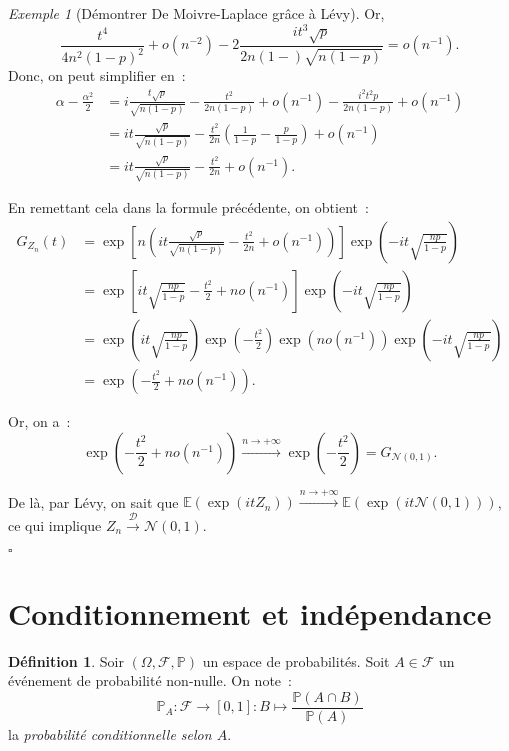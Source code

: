 \documentclass{article}
\newcommand{\E}{\mathbb E}
\renewcommand{\P}{\mathbb P}
\newcommand{\Nzu}{\mathcal N(0, 1)}  %
\newcommand{\convl}{\stackrel{\mathcal D}\to}  %
\newcommand{\espproba}[3]{\left(#1, #2, #3\right)}  %
\newcommand{\Ofp}{\espproba \Omega{\mathcal F}\P}  %
\theoremstyle{definition}
\newtheorem{déf}[thm]{Définition}
\theoremstyle{remark}
\newtheorem{ex}{Exemple}
\begin{document}
\begin{ex}[Démontrer De Moivre-Laplace grâce à Lévy]
		Or,
		\[\frac {t^4}{4n^2(1-p)^2} + o(n^{-2}) - 2\frac {it^3\sqrt p}{2n(1-)\sqrt {n(1-p)}} = o(n^{-1}).\]
		Donc, on peut simplifier en~:
		\begin{align*}
			\alpha - \frac {\alpha^2}2 &= i\frac {t\sqrt p}{\sqrt{n(1-p)}} - \frac {t^2}{2n(1-p)} + o(n^{-1}) - \frac {i^2t^2p}{2n(1-p)} + o(n^{-1}) \\
			                           &= it\frac {\sqrt p}{\sqrt{n(1-p)}} - \frac {t^2}{2n}\left(\frac 1{1-p} - \frac p{1-p}\right) + o(n^{-1}) \\
			                           &= it\frac {\sqrt p}{\sqrt{n(1-p)}} - \frac {t^2}{2n} + o(n^{-1}).
		\end{align*}

		En remettant cela dans la formule précédente, on obtient~:
		\begin{align*}
			G_{Z_n}(t) &= \exp\left[n\left(it\frac {\sqrt p}{\sqrt{n(1-p)}} - \frac {t^2}{2n} + o(n^{-1})\right)\right]\exp\left(-it\sqrt{\frac {np}{1-p}}\right) \\
			           &= \exp\left[it\sqrt{\frac {np}{1-p}} - \frac {t^2}2 + no(n^{-1})\right]\exp\left(-it\sqrt {\frac {np}{1-p}}\right) \\
			           &= \exp\left(it\sqrt{\frac {np}{1-p}}\right)\exp\left(-\frac {t^2}2\right)\exp(no(n^{-1}))\exp\left(-it\sqrt {\frac {np}{1-p}}\right) \\
					   &= \exp\left(-\frac {t^2}2 + no(n^{-1})\right).
		\end{align*}

		Or, on a~:
		\[\exp\left(-\frac {t^2}2 + no(n^{-1})\right) \stackrel{n \to +\infty}\to \exp\left(-\frac {t^2}2\right) = G_{\Nzu}.\]

		De là, par Lévy, on sait que $\E(\exp(itZ_n)) \stackrel{n \to +\infty}\to \E(\exp(it\Nzu))$, ce qui implique $Z_n \convl \Nzu$.

		\begin{flushright} $\square$ \end{flushright}
		\end{ex}

\newpage
\section{Conditionnement et indépendance}
		\begin{déf} Soir $\Ofp$ un espace de probabilités. Soit $A \in \mathcal F$ un événement de probabilité non-nulle. On note~:
		\[\P_A : \mathcal F \to [0, 1] : B \mapsto \frac {\P(A \cap B)}{\P(A)}\]
		la \emph{probabilité conditionnelle selon $A$}. \end{déf}
\end{document}
